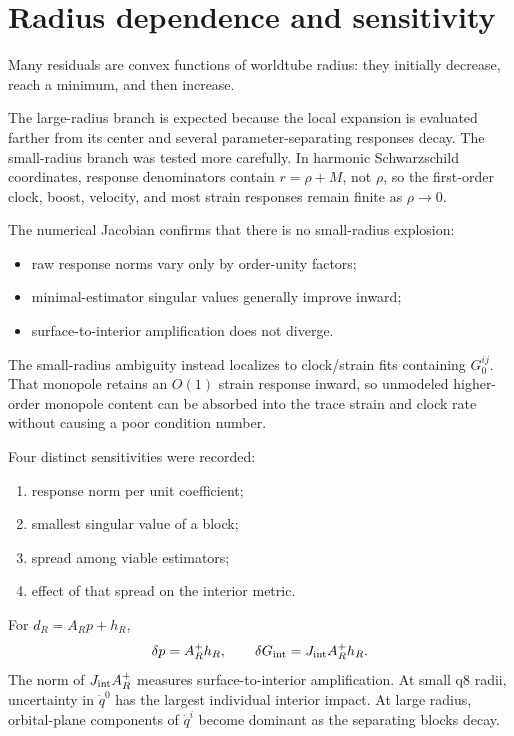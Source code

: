 \documentclass[11pt]{article}
\begin{document}
\section{Radius dependence and sensitivity}

Many residuals are convex functions of worldtube radius: they initially
decrease, reach a minimum, and then increase.

The large-radius branch is expected because the local expansion is evaluated
farther from its center and several parameter-separating responses decay.
The small-radius branch was tested more carefully.  In harmonic Schwarzschild
coordinates, response denominators contain \(r=\rho+M\), not \(\rho\), so
the first-order clock, boost, velocity, and most strain responses remain
finite as \(\rho\to0\).

The numerical Jacobian confirms that there is no small-radius explosion:

\begin{itemize}
  \item raw response norms vary only by order-unity factors;
  \item minimal-estimator singular values generally improve inward;
  \item surface-to-interior amplification does not diverge.
\end{itemize}

The small-radius ambiguity instead localizes to clock/strain fits containing
\(G^{ij}_{0}\).  That monopole retains an \(O(1)\) strain response inward, so
unmodeled higher-order monopole content can be absorbed into the trace strain
and clock rate without causing a poor condition number.

Four distinct sensitivities were recorded:

\begin{enumerate}
  \item response norm per unit coefficient;
  \item smallest singular value of a block;
  \item spread among viable estimators;
  \item effect of that spread on the interior metric.
\end{enumerate}

For \(d_R=A_Rp+h_R\),
\begin{equation}
\delta p=A_R^+h_R,
\qquad
\delta G_{\rm int}=J_{\rm int}A_R^+h_R.
\end{equation}
The norm of \(J_{\rm int}A_R^+\) measures surface-to-interior amplification.
At small q8 radii, uncertainty in \(\dot q^0\) has the largest individual
interior impact.  At large radius, orbital-plane components of \(\dot q^i\)
become dominant as the separating blocks decay.
\end{document}
